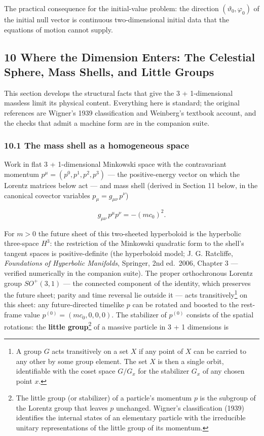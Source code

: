 \documentclass[
]{article}
\begin{document}
The practical consequence for the initial-value problem: the direction
\((\vartheta_{0}, \varphi_{0})\) of the initial null vector is
continuous two-dimensional initial data that the equations of motion
cannot supply.

\hypertarget{where-the-dimension-enters-the-celestial-sphere-mass-shells-and-little-groups}{%
\subsection{10 Where the Dimension Enters: The Celestial Sphere, Mass
Shells, and Little
Groups}\label{where-the-dimension-enters-the-celestial-sphere-mass-shells-and-little-groups}}

This section develops the structural facts that give the 3 +
1-dimensional massless limit its physical content. Everything here is
standard; the original references are Wigner's 1939 classification and
Weinberg's textbook account, and the checks that admit a machine form
are in the companion suite.

\hypertarget{the-mass-shell-as-a-homogeneous-space}{%
\subsubsection{10.1 The mass shell as a homogeneous
space}\label{the-mass-shell-as-a-homogeneous-space}}

Work in flat 3 + 1-dimensional Minkowski space with the contravariant
momentum \(p^{\mu} = (p^{0}, p^{1}, p^{2}, p^{3})\) --- the
positive-energy vector on which the Lorentz matrices below act --- and
mass shell (derived in Section 11 below, in the canonical covector
variables \(p_{\mu} = g_{\mu\nu}\, p^{\nu}\))

\[g_{\mu\nu}\, p^{\mu} p^{\nu} = - (mc_{0})^{2}. \tag{63}\]

For \(m > 0\) the future sheet of this two-sheeted hyperboloid is the
hyperbolic three-space \(H^{3}\): the restriction of the Minkowski
quadratic form to the shell's tangent spaces is positive-definite (the
hyperboloid model; J. G. Ratcliffe, \emph{Foundations of Hyperbolic
Manifolds}, Springer, 2nd ed.~2006, Chapter 3 --- verified numerically
in the companion suite). The proper orthochronous Lorentz group
\(SO^{+}(3, 1)\) --- the connected component of the identity, which
preserves the future sheet; parity and time reversal lie outside it ---
acts transitively\footnote{A group \(G\) acts transitively on a set
  \(X\) if any point of \(X\) can be carried to any other by some group
  element. The set \(X\) is then a single orbit, identifiable with the
  coset space \(G / G_{x}\) for the stabilizer \(G_{x}\) of any chosen
  point \(x\).} on this sheet: any future-directed timelike \(p\) can be
rotated and boosted to the rest-frame value
\(p^{(0)} = (mc_{0}, 0, 0, 0)\). The stabilizer of \(p^{(0)}\) consists
of the spatial rotations: the \textbf{little group}\footnote{The little
  group (or stabilizer) of a particle's momentum \(p\) is the subgroup
  of the Lorentz group that leaves \(p\) unchanged. Wigner's
  classification (1939) identifies the internal states of an elementary
  particle with the irreducible unitary representations of the little
  group of its momentum.} of a massive particle in 3 + 1 dimensions is
\end{document}
